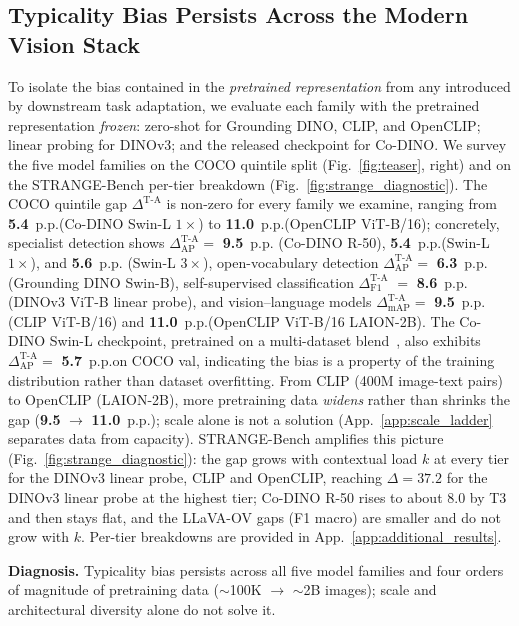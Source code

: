 \subsection{Typicality Bias Persists Across the Modern Vision Stack}
\label{sec:results_diagnostic}
\vspace{-3.0pt}
To isolate the bias contained in the \emph{pretrained representation}
from any introduced by downstream task adaptation, we evaluate each family with the pretrained representation \emph{frozen}: zero-shot for Grounding DINO, CLIP, and OpenCLIP; linear probing for DINOv3; and
the released checkpoint for Co-DINO. We
survey the five model families on the COCO quintile split
(Fig.~\ref{fig:teaser}, right) and on the STRANGE-Bench per-tier breakdown (Fig.~\ref{fig:strange_diagnostic}).
The COCO quintile gap $\Delta^{\text{T-A}}$ is non-zero for every family we examine, ranging from \textbf{5.4}~p.p.\@ (Co-DINO Swin-L $1\times$) to \textbf{11.0}~p.p.\@ (OpenCLIP ViT-B/16); concretely, specialist detection shows $\Delta^{\text{T-A}}_{\text{AP}} = $ \textbf{9.5}~p.p.\@
(Co-DINO R-50), \textbf{5.4}~p.p.\@ (Swin-L $1\times$), and \textbf{5.6}~p.p.\@
(Swin-L $3\times$), open-vocabulary detection
$\Delta^{\text{T-A}}_{\text{AP}} = $ \textbf{6.3}~p.p.\@ (Grounding DINO
Swin-B), self-supervised classification
$\Delta^{\text{T-A}}_{\text{F1}}$ $= $ \textbf{8.6}~p.p.\@ (DINOv3 ViT-B
linear probe), and vision--language models
$\Delta^{\text{T-A}}_{\text{mAP}} = $ \textbf{9.5}~p.p.\@ (CLIP ViT-B/16)
and \textbf{11.0}~p.p.\@ (OpenCLIP ViT-B/16 LAION-2B). The Co-DINO Swin-L checkpoint, pretrained on a multi-dataset blend~\cite{zong2023detrs}, also exhibits $\Delta^{\text{T-A}}_{\text{AP}} = $ \textbf{5.7}~p.p.\@ on COCO val, indicating the bias is a property of the training distribution rather than dataset overfitting. From CLIP (400M image-text pairs) to OpenCLIP (LAION-2B), more pretraining data \emph{widens} rather than shrinks the gap (\textbf{9.5} $\rightarrow$ \textbf{11.0}~p.p.\@); scale alone is not a solution (App.~\ref{app:scale_ladder} separates data from capacity).
STRANGE-Bench amplifies this picture (Fig.~\ref{fig:strange_diagnostic}): the gap grows with contextual load $k$ at every tier for the DINOv3 linear probe, CLIP and OpenCLIP, reaching $\Delta = 37.2$ for the DINOv3 linear probe at the highest tier; Co-DINO R-50 rises to about $8.0$ by T3 and then stays flat, and the LLaVA-OV gaps (F1 macro) are smaller and do not grow with $k$. Per-tier breakdowns are provided in App.~\ref{app:additional_results}.

\begin{finding}
\textbf{Diagnosis.} Typicality bias persists across all five model families and four orders of magnitude of pretraining data ($\sim$100K $\rightarrow$ $\sim$2B images); scale and architectural diversity alone do not solve it.
\end{finding}

